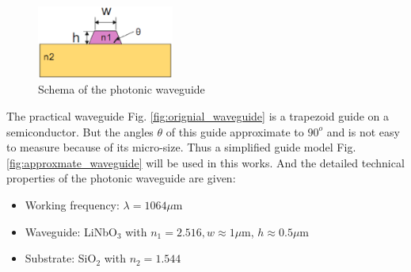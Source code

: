 \begin{figure}
\centering
\includegraphics[width=0.4\textwidth]{bilder/orignial_waveguide}
\caption{Schema of the photonic waveguide}
\label{fig:photonic_waveguide}
\end{figure}
The practical waveguide Fig. \ref{fig:orignial_waveguide} is a trapezoid guide on a semiconductor. But the angles $\theta$ of this guide approximate to $90^{o}$ and is not easy to measure because of its micro-size. Thus a simplified guide model Fig.\ref{fig:approxmate_waveguide} will be used in this works. And the detailed technical properties of the photonic waveguide are given:
\begin{itemize}
\item Working frequency: $\lambda=1064\mu$m
\item Waveguide: LiNbO$_{3}$ with $n_{1}=2.516, w\approx 1\mu$m, $h\approx 0.5 \mu$m
\item Substrate: SiO$_{2}$ with $n_{2}=1.544 $
\end{itemize}
